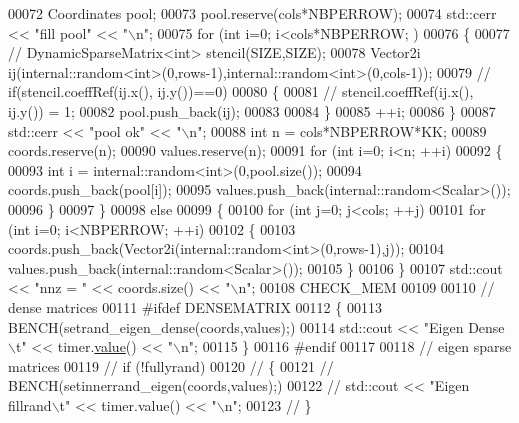 \begin{DoxyCode}
00072     Coordinates pool;
00073     pool.reserve(cols*NBPERROW);
00074     std::cerr << \textcolor{stringliteral}{"fill pool"} << \textcolor{stringliteral}{"\(\backslash\)n"};
00075     \textcolor{keywordflow}{for} (\textcolor{keywordtype}{int} i=0; i<cols*NBPERROW; )
00076     \{
00077 \textcolor{comment}{//       DynamicSparseMatrix<int> stencil(SIZE,SIZE);}
00078       Vector2i ij(internal::random<int>(0,rows-1),internal::random<int>(0,cols-1));
00079 \textcolor{comment}{//       if(stencil.coeffRef(ij.x(), ij.y())==0)}
00080       \{
00081 \textcolor{comment}{//         stencil.coeffRef(ij.x(), ij.y()) = 1;}
00082         pool.push\_back(ij);
00083 
00084       \}
00085       ++i;
00086     \}
00087     std::cerr << \textcolor{stringliteral}{"pool ok"} << \textcolor{stringliteral}{"\(\backslash\)n"};
00088     \textcolor{keywordtype}{int} n = cols*NBPERROW*KK;
00089     coords.reserve(n);
00090     values.reserve(n);
00091     \textcolor{keywordflow}{for} (\textcolor{keywordtype}{int} i=0; i<n; ++i)
00092     \{
00093       \textcolor{keywordtype}{int} i = internal::random<int>(0,pool.size());
00094       coords.push\_back(pool[i]);
00095       values.push\_back(internal::random<Scalar>());
00096     \}
00097   \}
00098   \textcolor{keywordflow}{else}
00099   \{
00100     \textcolor{keywordflow}{for} (\textcolor{keywordtype}{int} j=0; j<cols; ++j)
00101     \textcolor{keywordflow}{for} (\textcolor{keywordtype}{int} i=0; i<NBPERROW; ++i)
00102     \{
00103       coords.push\_back(Vector2i(internal::random<int>(0,rows-1),j));
00104       values.push\_back(internal::random<Scalar>());
00105     \}
00106   \}
00107   std::cout << \textcolor{stringliteral}{"nnz = "} << coords.size()  << \textcolor{stringliteral}{"\(\backslash\)n"};
00108   CHECK\_MEM
00109 
00110     \textcolor{comment}{// dense matrices}
00111 \textcolor{preprocessor}{    #ifdef DENSEMATRIX}
00112     \{
00113       BENCH(setrand\_eigen\_dense(coords,values);)
00114       std::cout << \textcolor{stringliteral}{"Eigen Dense\(\backslash\)t"} << timer.\hyperlink{class_eigen_1_1_bench_timer_a26760f963ed8b64c126159bfea57735e}{value}() << \textcolor{stringliteral}{"\(\backslash\)n"};
00115     \}
00116 \textcolor{preprocessor}{    #endif}
00117 
00118     \textcolor{comment}{// eigen sparse matrices}
00119 \textcolor{comment}{//     if (!fullyrand)}
00120 \textcolor{comment}{//     \{}
00121 \textcolor{comment}{//       BENCH(setinnerrand\_eigen(coords,values);)}
00122 \textcolor{comment}{//       std::cout << "Eigen fillrand\(\backslash\)t" << timer.value() << "\(\backslash\)n";}
00123 \textcolor{comment}{//     \}}

\end{DoxyCode}

